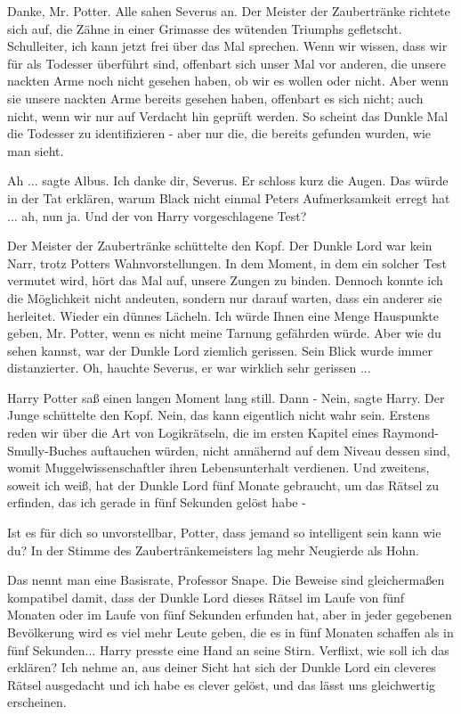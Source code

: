 \glqq{}Danke, Mr. Potter.\grqq{} Alle sahen Severus an. Der Meister der
Zaubertränke richtete sich auf, die Zähne in einer Grimasse des wütenden
Triumphs gefletscht. \glqq{}Schulleiter, ich kann jetzt frei über das Mal
sprechen. Wenn wir wissen, dass wir für als Todesser überführt sind, offenbart
sich unser Mal vor anderen, die unsere nackten Arme noch nicht gesehen haben, ob
wir es wollen oder nicht. Aber wenn sie unsere nackten Arme bereits gesehen
haben, offenbart es sich nicht; auch nicht, wenn wir nur auf Verdacht hin
geprüft werden. So scheint das Dunkle Mal die Todesser zu identifizieren - aber
nur die, die bereits gefunden wurden, wie man sieht.\grqq{}

\glqq{}Ah ...\grqq{} sagte Albus. \glqq{}Ich danke dir, Severus.\grqq{} Er schloss
kurz die Augen. \glqq{}Das würde in der Tat erklären, warum Black nicht einmal
Peters Aufmerksamkeit erregt hat ... ah, nun ja. Und der von Harry
vorgeschlagene Test?\grqq{}

Der Meister der Zaubertränke schüttelte den Kopf. \glqq{}Der Dunkle Lord war kein
Narr, trotz Potters Wahnvorstellungen. In dem Moment, in dem ein solcher Test
vermutet wird, hört das Mal auf, unsere Zungen zu binden. Dennoch konnte ich die
Möglichkeit nicht andeuten, sondern nur darauf warten, dass ein anderer sie
herleitet.\grqq{} Wieder ein dünnes Lächeln. \glqq{}Ich würde Ihnen eine Menge
Hauspunkte geben, Mr. Potter, wenn es nicht meine Tarnung gefährden würde. Aber
wie du sehen kannst, war der Dunkle Lord ziemlich gerissen.\grqq{} Sein Blick
wurde immer distanzierter. \glqq{}Oh\grqq{}, hauchte Severus, \glqq{}er war
wirklich sehr gerissen ...\grqq{}

Harry Potter saß einen langen Moment lang still. Dann - \glqq{}Nein\grqq{}, sagte
Harry. Der Junge schüttelte den Kopf. \glqq{}Nein, das kann eigentlich nicht wahr
sein. Erstens reden wir über die Art von Logikrätseln, die im ersten Kapitel
eines Raymond-Smully-Buches auftauchen würden, nicht annähernd auf dem Niveau
dessen sind, womit Muggelwissenschaftler ihren Lebensunterhalt verdienen. Und
zweitens, soweit ich weiß, hat der Dunkle Lord fünf Monate gebraucht, um das
Rätsel zu erfinden, das ich gerade in fünf Sekunden gelöst habe -\grqq{}

\glqq{}Ist es für dich so unvorstellbar, Potter, dass jemand so intelligent sein
kann wie du?\grqq{} In der Stimme des Zaubertränkemeisters lag mehr Neugierde
als Hohn.

\glqq{}Das nennt man eine Basisrate, Professor Snape. Die Beweise sind
gleichermaßen kompatibel damit, dass der Dunkle Lord dieses Rätsel im Laufe von
fünf Monaten oder im Laufe von fünf Sekunden erfunden hat, aber in jeder
gegebenen Bevölkerung wird es viel mehr Leute geben, die es in fünf Monaten
schaffen als in fünf Sekunden...\grqq{} Harry presste eine Hand an seine Stirn.
\glqq{}Verflixt, wie soll ich das erklären? Ich nehme an, aus deiner Sicht hat
sich der Dunkle Lord ein cleveres Rätsel ausgedacht und ich habe es clever
gelöst, und das lässt uns gleichwertig erscheinen.\grqq{}

